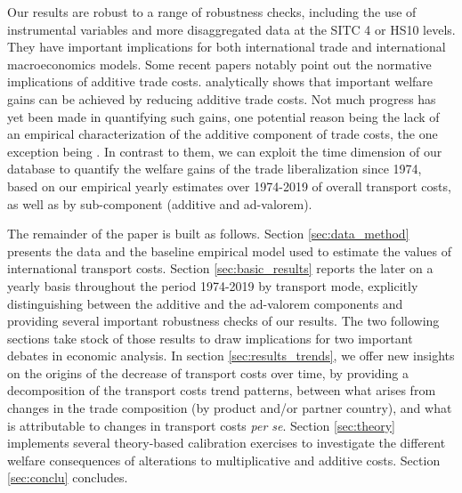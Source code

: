 \documentclass[a4paper,11pt]{article}
\begin{document}
Our results are robust to a range of robustness checks, including the use of instrumental variables and more disaggregated data at the SITC 4 or HS10 levels. They have important implications for both international trade and international macroeconomics models. Some recent papers notably point out the normative implications of additive trade costs. \cite{sorensen2014} analytically shows that important welfare gains can be achieved by reducing additive trade costs. Not much progress has yet been made in quantifying such gains, one potential reason being the lack of an empirical characterization of the additive component of trade costs, the one exception being \citealp{Irrazabal_2015}. In contrast to them, we can exploit the time dimension of our database to quantify the welfare gains of the trade liberalization since 1974, based on our empirical yearly estimates over 1974-2019 of overall transport costs, as well as by sub-component (additive and ad-valorem).\smallskip


The remainder of the paper is built as follows. Section \ref{sec:data_method} presents the data and the baseline empirical model used to estimate the values of international transport costs. Section \ref{sec:basic_results} reports the later on a yearly basis throughout the period 1974-2019 by transport mode, explicitly distinguishing between the additive and the ad-valorem components and providing several important robustness checks of our results. The two following sections take stock of those results to draw implications for two important debates in economic analysis. In section \ref{sec:results_trends}, we offer new insights on the origins of the decrease of transport costs over time, by providing a decomposition of the transport costs trend patterns, between what arises from changes in the trade composition (by product and/or partner country), and what is attributable to changes in transport costs \textit{per se}. Section \ref{sec:theory} implements several theory-based calibration exercises to investigate the different welfare consequences of alterations to multiplicative and additive costs. Section \ref{sec:conclu} concludes.
\end{document}
